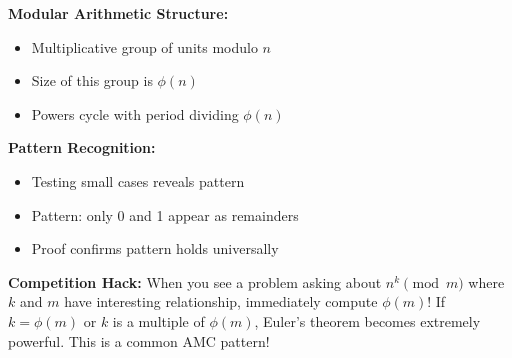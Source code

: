 \documentclass[12pt]{article}
\begin{document}
\begin{tacticalbox}
\textbf{Modular Arithmetic Structure:}
\begin{itemize}
    \item Multiplicative group of units modulo $n$
    \item Size of this group is $\phi(n)$
    \item Powers cycle with period dividing $\phi(n)$
\end{itemize}

\textbf{Pattern Recognition:}
\begin{itemize}
    \item Testing small cases reveals pattern
    \item Pattern: only 0 and 1 appear as remainders
    \item Proof confirms pattern holds universally
\end{itemize}
\end{tacticalbox}

\vspace{1em}

\begin{protipbox}
\textbf{Competition Hack:} When you see a problem asking about $n^k \pmod{m}$ where $k$ and $m$ have interesting relationship, immediately compute $\phi(m)$! If $k = \phi(m)$ or $k$ is a multiple of $\phi(m)$, Euler's theorem becomes extremely powerful. This is a common AMC pattern!
\end{protipbox}

\vspace{1em}
\end{document}

